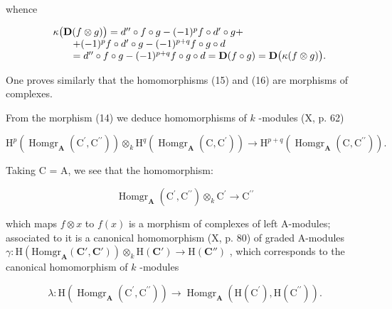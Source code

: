 whence

\[
\begin{array}{r l} & {\kappa \big (\mathbf {D} (f \otimes g) \big) = d ^ {\prime \prime} \circ f \circ g - (- 1) ^ {p} f \circ d ^ {\prime} \circ g +} \\ & {\qquad + (- 1) ^ {p} f \circ d ^ {\prime} \circ g - (- 1) ^ {p + q} f \circ g \circ d} \\ & {\qquad = d ^ {\prime \prime} \circ f \circ g - (- 1) ^ {p + q} f \circ g \circ d = \mathbf {D} (f \circ g) = \mathbf {D} \big (\kappa (f \otimes g) \big).} \end{array}
\]

One proves similarly that the homomorphisms (15) and (16) are morphisms of complexes.

From the morphism (14) we deduce homomorphisms of \(k\) -modules (X, p. 62)

\[
\mathrm{H} ^ {p} \left(\operatorname{Homgr} _ {\mathbf {A}} \left(\mathrm{C} ^ {\prime}, \mathrm{C} ^ {\prime \prime}\right)\right) \otimes_ {k} \mathrm{H} ^ {q} \left(\operatorname{Homgr} _ {\mathbf {A}} \left(\mathrm{C}, \mathrm{C} ^ {\prime}\right)\right)\rightarrow \mathrm{H} ^ {p + q} \left(\operatorname{Homgr} _ {\mathbf {A}} \left(\mathrm{C}, \mathrm{C} ^ {\prime \prime}\right)\right). \tag {17}
\]

Taking C = A, we see that the homomorphism:

\[
\operatorname{Homgr} _ {\mathbf {A}} \left(\mathrm{C} ^ {\prime}, \mathrm{C} ^ {\prime \prime}\right) \otimes_ {k} \mathrm{C} ^ {\prime} \rightarrow \mathrm{C} ^ {\prime \prime}\tag{18}
\]

which maps \(f \otimes x\) to \(f(x)\) is a morphism of complexes of left A-modules; associated to it is a canonical homomorphism (X, p. 80) of graded A-modules \(\gamma : \mathrm{H}(\mathrm{Homgr}_{\mathbf{A}}(\mathbf{C}', \mathbf{C}')) \otimes_k \mathrm{H}(\mathbf{C}') \to \mathrm{H}(\mathbf{C}'')\) , which corresponds to the canonical homomorphism of \(k\) -modules

\[
\lambda : \mathrm{H} (\operatorname{Homgr} _ {\mathbf {A}} \left(\mathrm{C} ^ {\prime}, \mathrm{C} ^ {\prime \prime}\right)) \rightarrow \operatorname{Homgr} _ {\mathbf {A}} \left(\mathrm{H} (\mathrm{C} ^ {\prime}), \mathrm{H} (\mathrm{C} ^ {\prime \prime})\right).
\]

